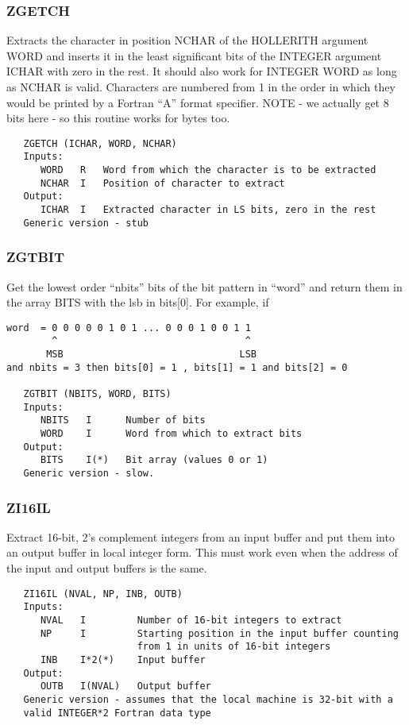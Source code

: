 \subsubsection{ZGETCH}
Extracts the character in position NCHAR of the HOLLERITH argument WORD
and inserts it in the least significant bits of the INTEGER argument
ICHAR with zero in the rest.  It should also work for INTEGER WORD
as long as NCHAR is valid.  Characters are numbered from 1 in the
order in which they would be printed by a Fortran ``A'' format
specifier.  NOTE - we actually get 8 bits here - so this routine
works for bytes too.
\begin{verbatim}
   ZGETCH (ICHAR, WORD, NCHAR)
   Inputs:
      WORD   R   Word from which the character is to be extracted
      NCHAR  I   Position of character to extract
   Output:
      ICHAR  I   Extracted character in LS bits, zero in the rest
   Generic version - stub
\end{verbatim}

\subsubsection{ZGTBIT}
Get the lowest order ``nbits'' bits of the bit pattern in ``word''
and return them in the array BITS with the lsb in bits[0].  For
example, if
\begin{verbatim}
word  = 0 0 0 0 0 1 0 1 ... 0 0 0 1 0 0 1 1
        ^                                 ^
       MSB                               LSB
and nbits = 3 then bits[0] = 1 , bits[1] = 1 and bits[2] = 0

   ZGTBIT (NBITS, WORD, BITS)
   Inputs:
      NBITS   I      Number of bits
      WORD    I      Word from which to extract bits
   Output:
      BITS    I(*)   Bit array (values 0 or 1)
   Generic version - slow.
\end{verbatim}

\subsubsection{ZI16IL}
Extract 16-bit, 2's complement integers from an input buffer and
put them into an output buffer in local integer form.  This must
work even when the address of the input and output buffers is the
same.
\begin{verbatim}
   ZI16IL (NVAL, NP, INB, OUTB)
   Inputs:
      NVAL   I         Number of 16-bit integers to extract
      NP     I         Starting position in the input buffer counting
                       from 1 in units of 16-bit integers
      INB    I*2(*)    Input buffer
   Output:
      OUTB   I(NVAL)   Output buffer
   Generic version - assumes that the local machine is 32-bit with a
   valid INTEGER*2 Fortran data type
\end{verbatim}

